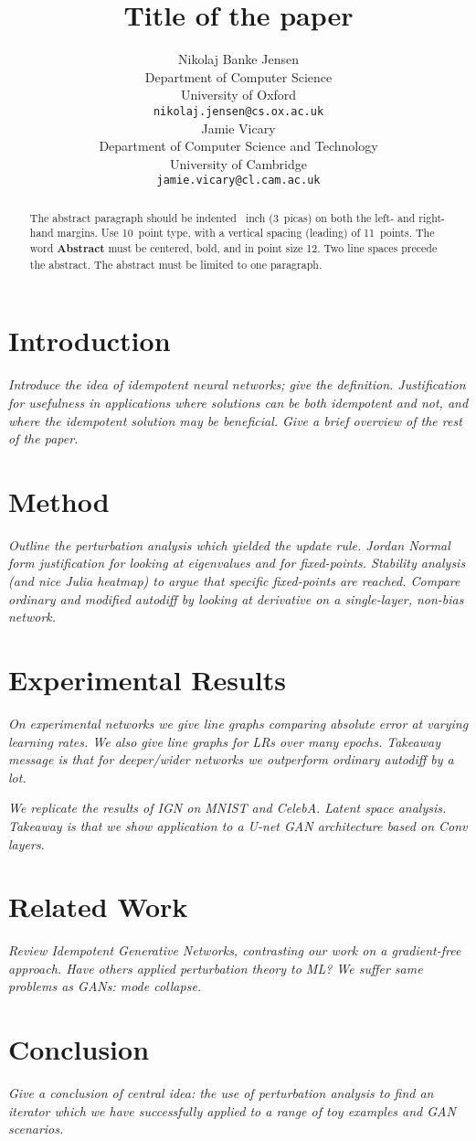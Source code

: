 \documentclass{article}
\title{Title of the paper}
\author{%
  Nikolaj Banke Jensen \\ %
  Department of Computer Science\\
  University of Oxford\\
  \texttt{nikolaj.jensen@cs.ox.ac.uk} \\
  \And
  Jamie Vicary \\
  Department of Computer Science and Technology \\
  University of Cambridge \\
  \texttt{jamie.vicary@cl.cam.ac.uk} \\
}
\begin{document}
\maketitle


\begin{abstract}
  The abstract paragraph should be indented ~inch (3~picas) on
  both the left- and right-hand margins. Use 10~point type, with a vertical
  spacing (leading) of 11~points.  The word \textbf{Abstract} must be centered,
  bold, and in point size 12. Two line spaces precede the abstract. The abstract
  must be limited to one paragraph.
\end{abstract}


\section{Introduction}
\textit{Introduce the idea of idempotent neural networks; give the definition. Justification for usefulness in applications where solutions can be both idempotent and not, and where the idempotent solution may be beneficial. Give a brief overview of the rest of the paper.}

\section{Method}
\textit{Outline the perturbation analysis which yielded the update rule. Jordan Normal form justification for looking at eigenvalues and for fixed-points. Stability analysis (and nice Julia heatmap) to argue that specific fixed-points are reached. Compare ordinary and modified autodiff by looking at derivative on a single-layer, non-bias network.}

\section{Experimental Results}
\textit{On experimental networks we give line graphs comparing absolute error at varying learning rates. We also give line graphs for LRs over many epochs. Takeaway message is that for deeper/wider networks we outperform ordinary autodiff by a lot.}

\textit{We replicate the results of IGN on MNIST and CelebA. Latent space analysis. Takeaway is that we show application to a U-net GAN architecture based on Conv layers.}

\section{Related Work}
\textit{Review Idempotent Generative Networks, contrasting our work on a gradient-free approach. Have others applied perturbation theory to ML? We suffer same problems as GANs: mode collapse.}

\section{Conclusion}
\textit{Give a conclusion of central idea: the use of perturbation analysis to find an iterator which we have successfully applied to a range of toy examples and GAN scenarios.}
\end{document}
